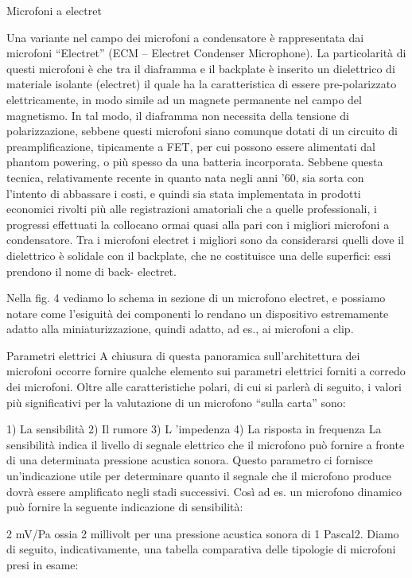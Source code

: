 Microfoni a electret

Una variante nel campo dei microfoni a condensatore è rappresentata dai microfoni “Electret” (ECM – Electret Condenser Microphone). La particolarità di questi microfoni è che tra il diaframma e il backplate è inserito un dielettrico di materiale isolante (electret) il quale ha la caratteristica di essere pre-polarizzato elettricamente, in modo simile ad un magnete permanente nel campo del magnetismo. In tal modo, il diaframma non necessita della tensione di polarizzazione, sebbene questi microfoni siano comunque dotati di un circuito di preamplificazione, tipicamente a FET, per cui possono essere alimentati dal phantom powering, o più spesso da una batteria incorporata. Sebbene questa tecnica, relativamente recente in quanto nata negli anni ’60, sia sorta con l’intento di abbassare i costi, e quindi sia stata implementata in prodotti economici rivolti più alle registrazioni amatoriali che a quelle professionali, i progressi effettuati la collocano ormai quasi alla pari con i migliori microfoni a condensatore. Tra i microfoni electret i migliori sono da considerarsi quelli dove il dielettrico è solidale con il backplate, che ne costituisce una delle superfici: essi prendono il nome di back- electret.

Nella fig. 4 vediamo lo schema in sezione di un microfono electret, e possiamo notare come l’esiguità dei componenti lo rendano un dispositivo estremamente adatto alla miniaturizzazione, quindi adatto, ad es., ai microfoni a clip.

Parametri elettrici
A chiusura di questa panoramica sull’architettura dei microfoni occorre fornire qualche elemento sui parametri elettrici forniti a corredo dei microfoni. Oltre alle caratteristiche polari, di cui si parlerà di seguito, i valori più significativi per la valutazione di un microfono “sulla carta” sono:

1) La sensibilità
2) Il rumore
3) L ’impedenza
4) La risposta in frequenza
La sensibilità indica il livello di segnale elettrico che il microfono può fornire a fronte di una determinata pressione acustica sonora. Questo parametro ci fornisce un’indicazione utile per determinare quanto il segnale che il microfono produce dovrà essere amplificato negli stadi successivi. Così ad es. un microfono dinamico può fornire la seguente indicazione di sensibilità:

2 mV/Pa
ossia 2 millivolt per una pressione acustica sonora di 1 Pascal2. Diamo di seguito, indicativamente, una tabella comparativa delle tipologie di microfoni presi in esame:

